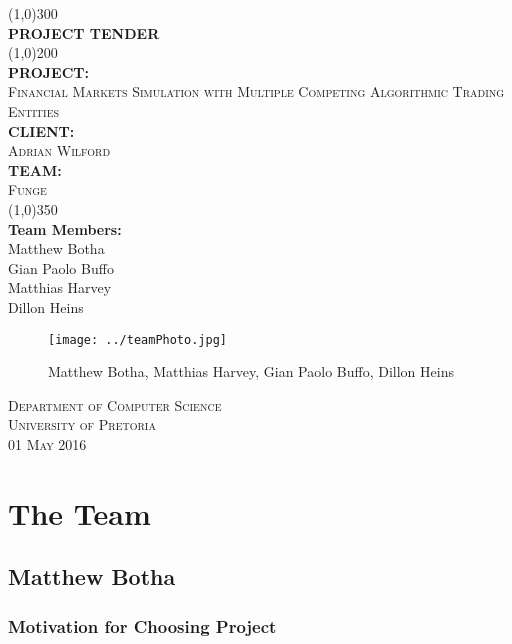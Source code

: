 \documentclass{article}
\begin{document}
\begin{titlepage}
	\begin{center}
		\line(1,0){300}\\
		[6mm]
		\huge{\bfseries PROJECT TENDER}\\
		[2mm]
		\line(1,0){200}\\
		[5mm]
		\large\textbf{PROJECT:}\\\textsc{Financial Markets Simulation with Multiple Competing Algorithmic Trading Entities}\\
		[3mm]
		\large\textbf{CLIENT:}\\\textsc{Adrian Wilford}\\
		[3mm]
		\large \textbf{TEAM:}\\\textsc{Funge}\\
		\line(1,0){350}\\
		[5mm]
		\large \textbf{Team Members:}\\
		[3mm]
		\large Matthew Botha\\
		\large Gian Paolo Buffo\\
		\large Matthias Harvey\\
        \large Dillon Heins\\[3mm]
		\begin{figure}[H]
			\centering
			\texttt{[image: ../teamPhoto.jpg]}
			\caption{Matthew Botha, Matthias Harvey, Gian Paolo Buffo, Dillon Heins}
		\end{figure}
    \end{center}

    \begin{flushright}
        \textsc{\large Department of Computer Science\\
        University of Pretoria\\
        01 May 2016\\}
    \end{flushright}
\end{titlepage}

\section{The Team}
	\subsection{Matthew Botha}
		\subsubsection{Motivation for Choosing Project}
\end{document}
